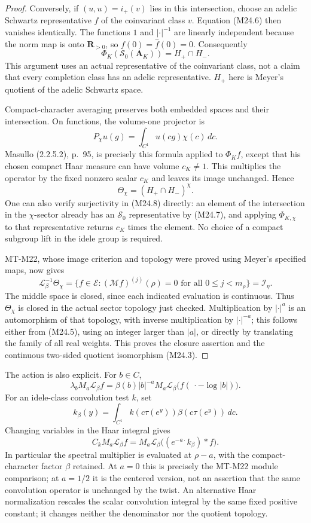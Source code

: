 \documentclass[11pt,a4paper]{article}
\begin{document}
\begin{proof}
Conversely, if $(u,u)=i_+(v)$ lies in this intersection, choose
an adelic Schwartz representative $f$ of the coinvariant class
$v$. Equation (M24.6) then vanishes identically. The functions
$1$ and $|\cdot|^{-1}$ are linearly independent because the norm
map is onto $\mathbf R_{>0}$, so $f(0)=\widehat f(0)=0$.
Consequently
\[
       \Phi_K(\mathcal S_0(\mathbf A_K))=H_+\cap H_-.
 \tag{M24.7}
\]
This argument uses an actual representative of the coinvariant
class, not a claim that every completion class has an adelic
representative. $H_+$ here is Meyer's quotient of the adelic
Schwartz space.

Compact-character averaging preserves both embedded spaces
and their intersection. On functions, the volume-one projector is
\[
 P_\chi u(g)=\int_{C^1}u(cg)\chi(c)\,dc.
\]
Masullo (2.2.5.2), p.~95, is precisely this formula applied to
$\Phi_K f$, except that his chosen compact Haar measure can have
volume $c_K\ne1$. This multiplies the operator by the fixed
nonzero scalar $c_K$ and leaves its image unchanged. Hence
\[
       \Theta_\chi=(H_+\cap H_-)^\chi.
 \tag{M24.8}
\]
One can also verify surjectivity in (M24.8) directly: an element
of the intersection in the $\chi$-sector already has an
$\mathcal S_0$ representative by (M24.7), and applying
$\Phi_{K,\chi}$ to that representative returns $c_K$ times the
element. No choice of a compact subgroup lift in the idele group
is required.

MT-M22, whose image criterion and topology were proved using
Meyer's specified maps, now gives
\[
 \mathcal L_\beta^{-1}\Theta_\chi
 =\{f\in\mathcal E:(\mathcal Mf)^{(j)}(\rho)=0
         \text{ for all }0\le j<m_\rho\}
 =\mathcal I_\eta.
 \tag{M24.9}
\]
The middle space is closed, since each indicated evaluation is
continuous. Thus $\Theta_\chi$ is closed in the actual sector
topology just checked. Multiplication by $|\cdot|^a$ is an
automorphism of that topology, with inverse multiplication by
$|\cdot|^{-a}$; this follows either from (M24.5), using an
integer larger than $|a|$, or directly by translating the family
of all real weights. This proves the closure assertion and the
continuous two-sided quotient isomorphism (M24.3).
\end{proof}

The action is also explicit. For $b\in C$,
\[
 \lambda_b M_a\mathcal L_\beta f
  =\beta(b)|b|^{-a}M_a\mathcal L_\beta
       \bigl(f(\,\cdot-\log|b|)\bigr).
 \tag{M24.10}
\]
For an idele-class convolution test $k$, set
\[
 k_\beta(y)=\int_{C^1}k(c\tau(e^y))\beta(c\tau(e^y))\,dc.
\]
Changing variables in the Haar integral gives
\[
 C_k M_a\mathcal L_\beta f
   =M_a\mathcal L_\beta\bigl((e^{-a\cdot}k_\beta)*f\bigr).
 \tag{M24.11}
\]
In particular the spectral multiplier is evaluated at $\rho-a$,
with the compact-character factor $\beta$ retained. At $a=0$ this
is precisely the MT-M22 module comparison; at $a=1/2$ it is the
centered version, not an assertion that the same convolution
operator is unchanged by the twist.
An alternative Haar normalization rescales the scalar convolution
integral by the same fixed positive constant; it changes neither
the denominator nor the quotient topology.
\end{document}
